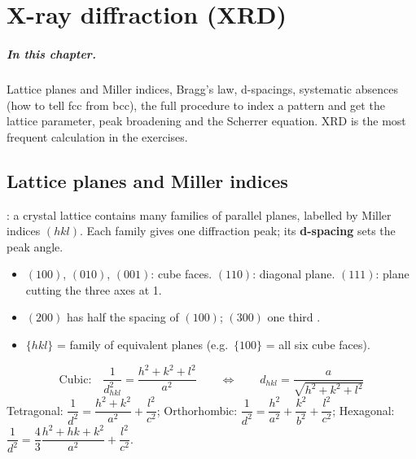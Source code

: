 \chapter{X-ray diffraction (XRD)}
\label{ch:xrd}

\paragraph{In this chapter.} Lattice planes and Miller indices, Bragg's law, d-spacings, systematic absences (how to tell
fcc from bcc), the full procedure to index a pattern and get the lattice parameter, peak broadening and the Scherrer
equation. XRD is the most frequent calculation in the exercises.

\section{Lattice planes and Miller indices}
: a crystal lattice contains many families of parallel planes, labelled by Miller indices $(hkl)$.
Each family gives one diffraction peak; its \textbf{d-spacing} sets the peak angle.
\begin{itemize}
  \item $(100)$, $(010)$, $(001)$: cube faces. $(110)$: diagonal plane. $(111)$: plane cutting the three axes at 1.
  \item $(200)$ has half the spacing of $(100)$; $(300)$ one third .
  \item $\{hkl\}$ = family of equivalent planes (e.g.\ $\{100\}$ = all six cube faces).
\end{itemize}

\begin{keybox}
\begin{equation}
\text{Cubic:}\quad \frac{1}{d_{hkl}^2} = \frac{h^2+k^2+l^2}{a^2}
\qquad\Longleftrightarrow\qquad \boxed{d_{hkl} = \frac{a}{\sqrt{h^2+k^2+l^2}}}
\label{eq:dcubic}
\end{equation}
Tetragonal: $\dfrac{1}{d^2} = \dfrac{h^2+k^2}{a^2} + \dfrac{l^2}{c^2}$; \quad
Orthorhombic: $\dfrac{1}{d^2} = \dfrac{h^2}{a^2}+\dfrac{k^2}{b^2}+\dfrac{l^2}{c^2}$; \quad
Hexagonal: $\dfrac{1}{d^2} = \dfrac{4}{3}\dfrac{h^2+hk+k^2}{a^2}+\dfrac{l^2}{c^2}$.
\end{keybox}

